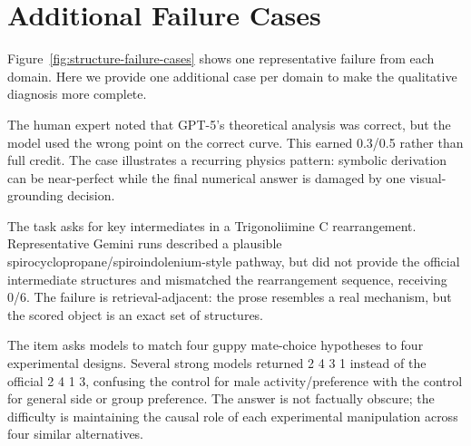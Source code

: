 \documentclass[11pt]{article}
\begin{document}



\appendix

\section{Additional Failure Cases}
\label{app:additional_cases}
Figure~\ref{fig:structure-failure-cases} shows one representative failure from each domain.
Here we provide one additional case per domain to make the qualitative diagnosis more complete.

\begin{tcolorbox}[
  title={Physics: correct theory, wrong graph binding (IPhO 2025 S1 B2)},
  colback=gray!3,
  colframe=black!35,
  boxrule=0.6pt,
  arc=1.5mm,
  left=1.5mm,right=1.5mm,top=1mm,bottom=1mm
]
\footnotesize
The human expert noted that GPT-5's theoretical analysis was correct, but the model used the wrong point on the correct curve.
This earned 0.3/0.5 rather than full credit.
The case illustrates a recurring physics pattern: symbolic derivation can be near-perfect while the final numerical answer is damaged by one visual-grounding decision.
\end{tcolorbox}

\begin{tcolorbox}[
  title={Chemistry: plausible mechanism, wrong intermediates (CChO 2025 Q9.7)},
  colback=gray!3,
  colframe=black!35,
  boxrule=0.6pt,
  arc=1.5mm,
  left=1.5mm,right=1.5mm,top=1mm,bottom=1mm
]
\footnotesize
The task asks for key intermediates in a Trigonoliimine C rearrangement.
Representative Gemini runs described a plausible spirocyclopropane/spiroindolenium-style pathway, but did not provide the official intermediate structures and mismatched the rearrangement sequence, receiving 0/6.
The failure is retrieval-adjacent: the prose resembles a real mechanism, but the scored object is an exact set of structures.
\end{tcolorbox}

\begin{tcolorbox}[
  title={Biology: experimental-design matching error (IBO 2023 Item 20)},
  colback=gray!3,
  colframe=black!35,
  boxrule=0.6pt,
  arc=1.5mm,
  left=1.5mm,right=1.5mm,top=1mm,bottom=1mm
]
\footnotesize
The item asks models to match four guppy mate-choice hypotheses to four experimental designs.
Several strong models returned 2 4 3 1 instead of the official 2 4 1 3, confusing the control for male activity/preference with the control for general side or group preference.
The answer is not factually obscure; the difficulty is maintaining the causal role of each experimental manipulation across four similar alternatives.
\end{tcolorbox}
\end{document}
